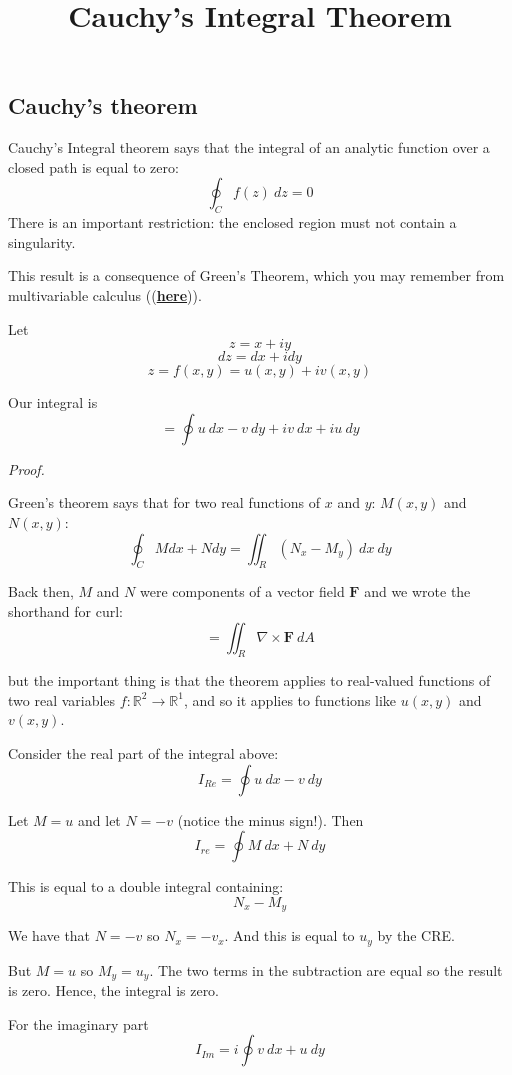 \documentclass[11pt, oneside]{article}
\title{Cauchy's Integral Theorem}
\date{}
\begin{document}
\maketitle
\Large


\subsection*{Cauchy's theorem}

Cauchy's Integral theorem says that the integral of an analytic function over a closed path is equal to zero:
\[ \oint_C f(z) \ dz = 0 \]
There is an important restriction:  the enclosed region must not contain a singularity.

This result is a consequence of Green's Theorem, which you may remember from multivariable calculus ((\hyperref[sec:green]{\textbf{here}})).

Let
\[ z = x + i y \]
\[ dz = dx + i dy \]
\[ z = f(x,y) = u(x,y) + iv(x,y) \]

Our integral is
\[ =  \oint u \ dx - v \ dy + i v \ dx + i u \ dy \]

\emph{Proof.}

Green's theorem says that for two real functions of $x$ and $y$:  $M(x,y)$ and $N(x,y)$:
\[ \oint_C M dx + N dy = \iint_R (N_x - M_y) \ dx \ dy \]

Back then, $M$ and $N$ were components of a vector field $\mathbf{F}$ and we wrote the shorthand for curl:
\[ = \iint_R \nabla \times \mathbf{F} \ dA\]

but the important thing is that the theorem applies to real-valued functions of two real variables $f: \mathbb{R}^2 \rightarrow \mathbb{R}^1$, and so it applies to functions like $u(x,y)$ and $v(x,y)$.

Consider the real part of the integral above:
\[ I_{Re} = \oint u \ dx - v \ dy \]

Let $M = u$ and let $N = - v$ (notice the minus sign!).  Then
\[ I_{re} = \oint M \ dx + N \ dy \]

This is equal to a double integral containing:
\[ N_x - M_y \]

We have that $N = -v$ so $N_x = - v_x$.  And this is equal to $u_y$ by the CRE.

But $M = u$ so $M_y = u_y$. The two terms in the subtraction are equal so the result is zero.  Hence, the integral is zero.

For the imaginary part 
\[ I_{Im} = i \oint v \ dx + u \ dy \]
\end{document}
